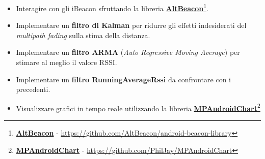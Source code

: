 \begin{itemize}
		
	
	\item Interagire con gli iBeacon sfruttando la libreria \href{https://github.com/AltBeacon/android-beacon-library}{\textbf{AltBeacon}}\footnote{\href{https://github.com/AltBeacon/android-beacon-library}{\textbf{AltBeacon}} - \url{https://github.com/AltBeacon/android-beacon-library}}.
	
	\item Implementare un \textbf{filtro di Kalman} per ridurre gli effetti indesiderati del \textit{multipath fading} sulla stima della distanza.
	
	\item Implementare un \textbf{filtro ARMA} (\textit{Auto Regressive Moving Average}) per stimare al meglio il valore RSSI.
	
	\item Implementare un \textbf{filtro RunningAverageRssi} da confrontare con i precedenti.
	
	\item Visualizzare grafici in tempo reale utilizzando la libreria \href{https://github.com/PhilJay/MPAndroidChart}{\textbf{MPAndroidChart}}\footnote{\href{https://github.com/PhilJay/MPAndroidChart}{\textbf{MPAndroidChart}} - \url{https://github.com/PhilJay/MPAndroidChart}}

	
\end{itemize}


